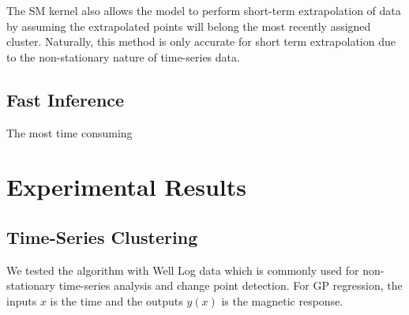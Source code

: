 \documentclass{article}
\begin{document}
The SM kernel also allows the model to perform short-term extrapolation of data by assuming the extrapolated points will belong the most recently assigned cluster. Naturally, this method is only accurate for short term extrapolation due to the non-stationary nature of time-series data.

\subsection{Fast Inference}

The most time consuming

\section{Experimental Results}

\subsection{Time-Series Clustering}

We tested the algorithm with Well Log data \cite{WellLog} which is commonly used for non-stationary time-series analysis and change point detection. For GP regression, the inputs $x$ is the time and the outputs $y(x)$ is the magnetic response.
\end{document}
